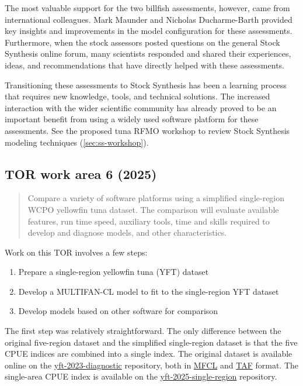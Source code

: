 \documentclass{SCreport}
\newcommand\ofpsam{https://github.com/PacificCommunity/ofp-sam}
\begin{document}
The most valuable support for the two billfish assessments, however, came from
international colleagues. Mark Maunder and Nicholas Ducharme-Barth provided key
insights and improvements in the model configuration for these assessments.
Furthermore, when the stock assessors posted questions on the general Stock
Synthesis online forum, many scientists responded and shared their experiences,
ideas, and recommendations that have directly helped with these assessments.

Transitioning these assessments to Stock Synthesis has been a learning process
that requires new knowledge, tools, and technical solutions. The increased
interaction with the wider scientific community has already proved to be an
important benefit from using a widely used software platform for these
assessments. See the proposed tuna RFMO workshop to review Stock Synthesis
modeling techniques (\autoref{sec:ss-workshop}).

\vspace{2ex}

\subsection{TOR work area 6 (2025)}

\begin{quote}\sf
  Compare a variety of software platforms using a simplified single-region WCPO
  yellowfin tuna dataset. The comparison will evaluate available features, run
  time speed, auxiliary tools, time and skills required to develop and diagnose
  models, and other characteristics.
\end{quote}

\vspace{2ex}

Work on this TOR involves a few steps:

\begin{enumerate}
  \item Prepare a single-region yellowfin tuna (YFT) dataset\\[-4ex]
  \item Develop a MULTIFAN-CL model to fit to the single-region YFT
  dataset\\[-4ex]
  \item Develop models based on other software for comparison
\end{enumerate}

The first step was relatively straightforward. The only difference between the
original five-region dataset and the simplified single-region dataset is that
the five CPUE indices are combined into a single index. The original dataset is
available online on the \href{\ofpsam-yft-2023-diagnostic}{yft-2023-diagnostic}
repository, both in \href{\ofpsam-yft-2023-diagnostic/tree/main/MFCL}{MFCL} and
\href{\ofpsam-yft-2023-diagnostic/tree/main/TAF/data}{TAF} format. The
single-area CPUE index is available on the
\href{\ofpsam-yft-2025-single-region/blob/main/data/cpue/cpue_quarter.csv}
{yft-2025-single-region} repository.
\end{document}
